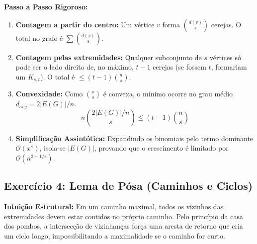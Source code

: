 \documentclass[11pt, a4paper]{article}
\begin{document}
\textbf{Passo a Passo Rigoroso:}
\begin{enumerate}
    \item \textbf{Contagem a partir do centro:} Um vértice $v$ forma $\binom{d(v)}{s}$ cerejas. O total no grafo é $\sum \binom{d(v)}{s}$.
    \item \textbf{Contagem pelas extremidades:} Qualquer subconjunto de $s$ vértices só pode ser o lado direito de, no máximo, $t-1$ cerejas (se fossem $t$, formariam um $K_{s,t}$). O total é $\le (t-1)\binom{n}{s}$.
    \item \textbf{Convexidade:} Como $\binom{x}{s}$ é convexa, o mínimo ocorre no grau médio $d_{avg} = 2|E(G)|/n$.
    \[ n\binom{2|E(G)|/n}{s} \le (t-1)\binom{n}{s} \]
    \item \textbf{Simplificação Assintótica:} Expandindo os binomiais pelo termo dominante $\mathcal{O}(x^s)$, isola-se $|E(G)|$, provando que o crescimento é limitado por $\mathcal{O}(n^{2-1/s})$.
\end{enumerate}

\subsection*{Exercício 4: Lema de Pósa (Caminhos e Ciclos)}
\textbf{Intuição Estrutural:} Em um caminho maximal, todos os vizinhos das extremidades devem estar contidos no próprio caminho. Pelo princípio da casa dos pombos, a intersecção de vizinhanças força uma aresta de retorno que cria um ciclo longo, impossibilitando a maximalidade se o caminho for curto.

\begin{center}
\end{center}
\end{document}
